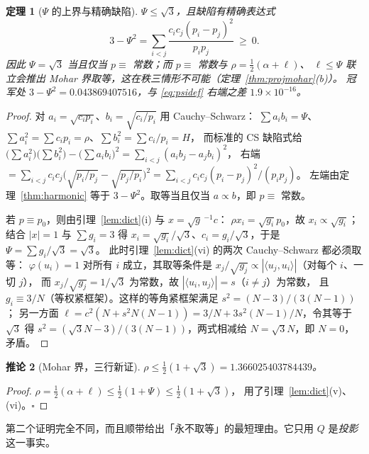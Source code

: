 \documentclass[UTF8,11pt]{ctexart}
\newtheorem{theorem}{定理}[section]
\newtheorem{corollary}[theorem]{推论}
\theoremstyle{definition}
\begin{document}
\begin{theorem}[$\Psi$ 的上界与精确缺陷]\label{thm:psi}
$\Psi\le\sqrt3$，且缺陷有\emph{精确}表达式
\begin{equation}\label{eq:psidef}
3-\Psi^2=\sum_{i<j}\frac{c_ic_j(p_i-p_j)^2}{p_ip_j}\ \ge\ 0 .
\end{equation}
因此 $\Psi=\sqrt3$ 当且仅当 $p\equiv$ 常数；而 $p\equiv$ 常数与 $\rho=\frac12(\alpha+\ell)$、
$\ell\le\Psi$ 联立会推出 Mohar 界取等，这在秩三情形不可能（定理~\ref{thm:projmohar}(b)）。
冠军处 $3-\Psi^2=0.043869407516$，与 \eqref{eq:psidef} 右端之差 $1.9\times10^{-16}$。
\end{theorem}

\begin{proof}
对 $a_i=\sqrt{c_ip_i}$、$b_i=\sqrt{c_i/p_i}$ 用 Cauchy--Schwarz：
$\sum a_ib_i=\Psi$、$\sum a_i^2=\sum c_ip_i=\rho$、$\sum b_i^2=\sum c_i/p_i=H$，
而标准的 CS 缺陷式给
$\bigl(\sum a_i^2\bigr)\bigl(\sum b_i^2\bigr)-\bigl(\sum a_ib_i\bigr)^2=\sum_{i<j}(a_ib_j-a_jb_i)^2$，
右端 $=\sum_{i<j}c_ic_j\bigl(\sqrt{p_i/p_j}-\sqrt{p_j/p_i}\bigr)^2=\sum_{i<j}c_ic_j(p_i-p_j)^2/(p_ip_j)$。
左端由定理~\ref{thm:harmonic} 等于 $3-\Psi^2$。取等当且仅当 $a\propto b$，即 $p\equiv$ 常数。

若 $p\equiv p_0$，则由引理~\ref{lem:dict}(i) 与 $x=\sqrt g\,^{-1}c$：
$\rho x_i=\sqrt{g_i}p_0$，故 $x_i\propto\sqrt{g_i}$；结合 $|x|=1$ 与 $\sum g_i=3$ 得
$x_i=\sqrt{g_i}/\sqrt3$、$c_i=g_i/\sqrt3$，于是 $\Psi=\sum g_i/\sqrt3=\sqrt3$。
此时引理~\ref{lem:dict}(vi) 的两次 Cauchy--Schwarz 都必须取等：
$\varphi(u_i)=1$ 对所有 $i$ 成立，其取等条件是
$x_j/\sqrt{g_j}\propto|\langle u_j,u_i\rangle|$（对每个 $i$、一切 $j$），
而 $x_j/\sqrt{g_j}=1/\sqrt3$ 为常数，故 $|\langle u_i,u_j\rangle|=s$（$i\ne j$）为常数，
且 $g_i\equiv3/N$（等权紧框架）。这样的等角紧框架满足 $s^2=(N-3)/(3(N-1))$；
另一方面 $\ell=c^2(N+s^2N(N-1))=3/N+3s^2(N-1)/N$，令其等于 $\sqrt3$ 得
$s^2=(\sqrt3N-3)/(3(N-1))$，两式相减给 $N=\sqrt3N$，即 $N=0$，矛盾。
\end{proof}

\begin{corollary}[Mohar 界，三行新证]\label{cor:mohar3}
$\rho\le\frac12(1+\sqrt3)=1.366025403784439$。
\end{corollary}

\begin{proof}
$\rho=\frac12(\alpha+\ell)\le\frac12(1+\Psi)\le\frac12(1+\sqrt3)$，
用了引理~\ref{lem:dict}(v)、(vi)。$\square$
\end{proof}

第二个证明完全不同，而且顺带给出「永不取等」的最短理由。它只用 $Q$ 是\emph{投影}这一事实。
\end{document}
